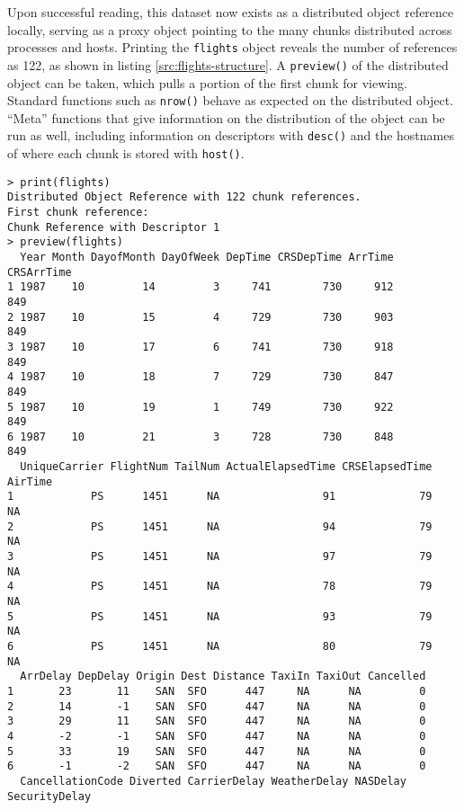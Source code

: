 Upon successful reading, this dataset now exists as a distributed object reference locally, serving as a proxy object pointing to the many chunks distributed across processes and hosts.
Printing the \texttt{flights} object reveals the number of references as 122, as shown in listing \ref{src:flights-structure}.
A \texttt{preview()} of the distributed object can be taken, which pulls a portion of the first chunk for viewing.
Standard functions such as \texttt{nrow()} behave as expected on the distributed object.
``Meta'' functions that give information on the distribution of the object can be run as well, including information on descriptors with \texttt{desc()} and the hostnames of where each chunk is stored with \texttt{host()}.

\begin{listing}[H]
\begin{verbatim}
> print(flights)
Distributed Object Reference with 122 chunk references.
First chunk reference:
Chunk Reference with Descriptor 1
> preview(flights)
  Year Month DayofMonth DayOfWeek DepTime CRSDepTime ArrTime CRSArrTime
1 1987    10         14         3     741        730     912        849
2 1987    10         15         4     729        730     903        849
3 1987    10         17         6     741        730     918        849
4 1987    10         18         7     729        730     847        849
5 1987    10         19         1     749        730     922        849
6 1987    10         21         3     728        730     848        849
  UniqueCarrier FlightNum TailNum ActualElapsedTime CRSElapsedTime AirTime
1            PS      1451      NA                91             79      NA
2            PS      1451      NA                94             79      NA
3            PS      1451      NA                97             79      NA
4            PS      1451      NA                78             79      NA
5            PS      1451      NA                93             79      NA
6            PS      1451      NA                80             79      NA
  ArrDelay DepDelay Origin Dest Distance TaxiIn TaxiOut Cancelled
1       23       11    SAN  SFO      447     NA      NA         0
2       14       -1    SAN  SFO      447     NA      NA         0
3       29       11    SAN  SFO      447     NA      NA         0
4       -2       -1    SAN  SFO      447     NA      NA         0
5       33       19    SAN  SFO      447     NA      NA         0
6       -1       -2    SAN  SFO      447     NA      NA         0
  CancellationCode Diverted CarrierDelay WeatherDelay NASDelay SecurityDelay

\end{verbatim}
\end{listing}
